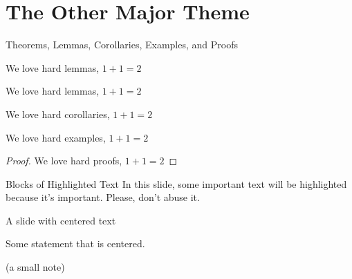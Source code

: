 \documentclass[11pt,aspectratio=169]{beamer}
\begin{document}
\section{The Other Major Theme}
\begin{frame}{Theorems, Lemmas, Corollaries, Examples, and Proofs}

\begin{theorem}
We love hard lemmas, $1 + 1 = 2$
\end{theorem}

\begin{lemma}
We love hard lemmas, $1 + 1 = 2$
\end{lemma}

\begin{corollary}
We love hard corollaries, $1 + 1 = 2$
\end{corollary}

\begin{example}
We love hard examples, $1 + 1 = 2$
\end{example}

\begin{proof}
We love hard proofs, $1 + 1 = 2$
\end{proof}

\end{frame}

\begin{frame}{Blocks of Highlighted Text}
In this slide, some important text will be \alert{highlighted} because it's important. Please, don't abuse it. 



\end{frame}

\begin{frame}{A slide with centered text}

  \begin{center}
    Some statement that is centered.
  \end{center}

  \vspace{2ex}
  \begin{center}
    \scriptsize (a small note)
  \end{center}

\end{frame}
\end{document}
